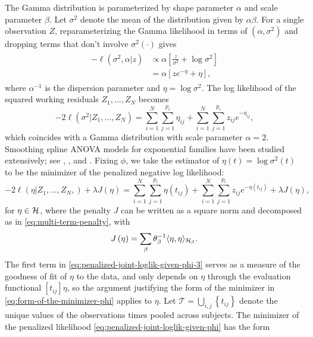 The Gamma distribution is parameterized by shape parameter $\alpha$ and scale parameter $\beta$. Let $\sigma^2$ denote the mean of the distribution given by $\alpha \beta$. For a single observation $Z$, reparameterizing the Gamma likelihood in terms of $\left(\alpha, \sigma^2 \right)$ and dropping terms that don't involve $\sigma^2\left(\cdot\right)$ gives  
\begin{align}
\begin{split}
-\ell \left(\sigma^2, \alpha \vert z \right) &\propto \alpha\left[\frac{z}{\sigma^2} + \log \sigma^2\right]  \\ 
&= \alpha\left[ze^{-\eta} + \eta\right],\label{eq:gamma-iv-likelihood-canonical-link}
\end{split}
\end{align}
\noindent
where $\alpha^{-1}$ is the dispersion parameter and $\eta = \log \sigma^2$. The log likelihood of the squared working residuals $Z_1,\dots, Z_N$ becomes 
\begin{equation} \label{eq:penalized-joint-loglik-given-phi-3}
-2\ell\left(  \sigma^2 \vert Z_1,\dots, Z_N \right) =  \sum_{i = 1}^N \sum_{j = 1}^{p_i} \eta_{ij}  + \sum_{i = 1}^N \sum_{j = 1}^{p_i} z_{ij}e^{-\eta_{ij}},
\end{equation}
\noindent
which coincides with a Gamma distribution with scale parameter $\alpha = 2$. Smoothing spline ANOVA models for exponential families have been studied extensively; see \cite{wahba1995smoothing}, \cite{wang1997grkpack}, and \cite{gu2013smoothing}. Fixing $\phi$, we take the estimator of $\eta\left(t\right) = \log\sigma^2\left(t\right)$ to be the minimizer of the penalized negative log likelihood:
\begin{equation} \label{eq:penalized-joint-loglik-given-phi}
-2\ell\left( \eta \vert Z_1,\dots, Z_N, \right) +\lambda J \left(\eta\right) =  \sum_{i = 1}^N \sum_{j = 1}^{p_i} \eta\left(t_{ij}\right)  + \sum_{i = 1}^N \sum_{j = 1}^{p_i} z_{ij} e^{-\eta\left(t_{ij}\right)} + \lambda J\left(\eta\right),  
\end{equation}
\noindent
for $\eta \in \mathcal{H}$, where the penalty $J$ can be written as a square norm and decomposed as in \eqref{eq:multi-term-penalty}, with
\begin{equation*} 
J\left(\eta \right) = \sum_{\beta} \theta_\beta^{-1}\langle \eta,\eta \rangle_{\mathcal{H}_\beta}.
\end{equation*}
\noindent 
The first term in \eqref{eq:penalized-joint-loglik-given-phi-3} serves as a measure of the goodness of fit of $\eta$ to the data, and only depends on $\eta$ through the evaluation functional $\left[t_{ij}\right]\eta$, so the argument justifying the form of the minimizer in \eqref{eq:form-of-the-minimizer-phi} applies to $\eta$. Let $\mathcal{T} = \bigcup_{i,j} \left\{t_{ij}\right\}$ denote the unique values of the observations times pooled across subjects. The minimizer of the penalized likelihood \eqref{eq:penalized-joint-loglik-given-phi} has the form 

